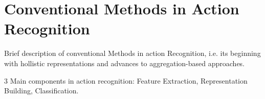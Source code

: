 \section{Conventional Methods in Action Recognition}
Brief description of conventional Methods in action Recognition, i.e. its beginning with hollistic representations and advances to aggregation-based approaches.

3 Main components in action recognition: Feature Extraction, Representation Building, Classification.
